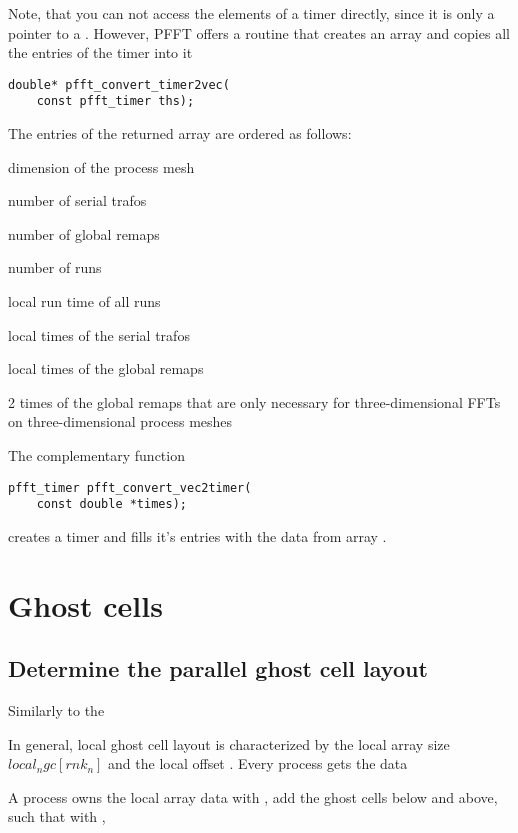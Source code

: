 Note, that you can not access the elements of a timer directly, since it is only a pointer to a .
However, PFFT offers a routine that creates an array and copies all the entries of the timer into it
\begin{lstlisting}
double* pfft_convert_timer2vec(
    const pfft_timer ths);
\end{lstlisting}
The entries of the returned array are ordered as follows:
\begin{compactitem}
  \item dimension of the process mesh 
  \item number of serial trafos 
  \item number of global remaps 
  \item number of  runs 
  \item local run time of all runs
  \item {} local times of the serial trafos
  \item {} local times of the global remaps
  \item 2 times of the global remaps that are only necessary for three-dimensional FFTs on three-dimensional process meshes
\end{compactitem}

The complementary function
\begin{lstlisting}
pfft_timer pfft_convert_vec2timer(
    const double *times);
\end{lstlisting}
creates a timer and fills it's entries with the data from array .


\section{Ghost cells}

\subsection{Determine the parallel ghost cell layout}

Similarly to the

In general, local ghost cell layout is characterized by the local array size $local_ngc[rnk_n]$ and
the local offset . Every process gets the data

A process owns the local array data
 with ,
add the ghost cells below and above, such that
 with ,


